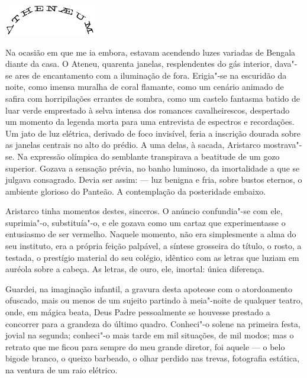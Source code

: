 \begin{center}\includegraphics[width=4cm]{3.png}\end{center}

Na ocasião em que me ia embora,
estavam acendendo luzes variadas de Bengala diante da casa. O Ateneu,
quarenta janelas, resplendentes do gás interior, dava"-se ares de
encantamento com a iluminação de fora. Erigia"-se na escuridão da
noite, como imensa muralha de coral flamante, como um cenário animado
de safira com horripilações errantes de sombra, como um castelo
fantasma batido de luar verde emprestado à selva intensa dos romances
cavalheirescos, despertado um momento da legenda morta para uma
entrevista de espectros e recordações. Um jato de luz elétrica,
derivado de foco invisível, feria a inscrição
dourada sobre as janelas centrais no alto do prédio. A uma delas, à sacada,
Aristarco mostrava"-se. Na expressão olímpica do semblante transpirava
a beatitude de um gozo superior. Gozava a sensação prévia, no banho
luminoso, da imortalidade a que se julgava consagrado. Devia ser assim:
--- luz benigna e fria, sobre bustos eternos, o ambiente glorioso do Panteão. A
contemplação da posteridade embaixo. 

Aristarco tinha momentos destes,
sinceros. O anúncio confundia"-se com ele, suprimia"-o, substituía"-o,
e ele gozava como um cartaz que experimentasse o entusiasmo de ser
vermelho. Naquele momento, não era simplesmente a alma do seu
instituto, era a própria feição palpável, a síntese grosseira do
título, o rosto, a testada, o prestígio material do seu colégio,
idêntico com as letras que luziam em auréola sobre a cabeça. As letras,
de ouro, ele, imortal: única diferença. 


Guardei, na imaginação
infantil, a gravura desta apoteose com o atordoamento ofuscado, mais ou
menos de um sujeito partindo à meia"-noite de qualquer teatro, onde,
em mágica beata, Deus Padre pessoalmente se houvesse prestado a
concorrer para a grandeza do último quadro. Conheci"-o solene na
primeira festa, jovial na segunda; conheci"-o mais tarde em mil
situações, de mil modos; mas o retrato que me ficou para sempre do meu
grande diretor, foi aquele --- o belo bigode branco, o queixo barbeado,
o olhar perdido nas trevas, fotografia estática, na ventura de um raio
elétrico. 

